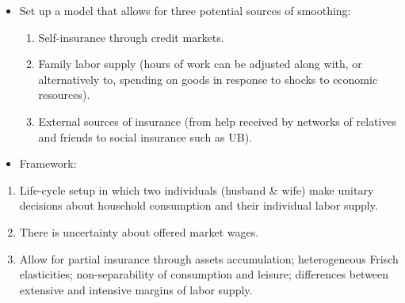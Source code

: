 \documentclass[notes=show]{beamer}
\begin{document}
\begin{frame}%


\begin{itemize}
\item Set up a model that allows for three potential sources of smoothing:

\begin{enumerate}
\item Self-insurance through credit markets.

\item Family labor supply (hours of work can be adjusted along with, or
alternatively to, spending on goods in response to shocks to economic
resources).

\item External sources of insurance (from help received by networks of
relatives and friends to social insurance such as UB).
\end{enumerate}

\item Framework:
\end{itemize}

\begin{enumerate}
\item Life-cycle setup in which two individuals (husband \& wife) make
unitary decisions about household consumption and their individual labor
supply.

\item There is uncertainty about offered market wages.

\item Allow for partial insurance through assets accumulation; heterogeneous
Frisch elasticities; non-separability of consumption and leisure;
differences between extensive and intensive margins of labor supply.
\end{enumerate}

\transboxout%
\end{frame}%

\bigskip
\end{document}
